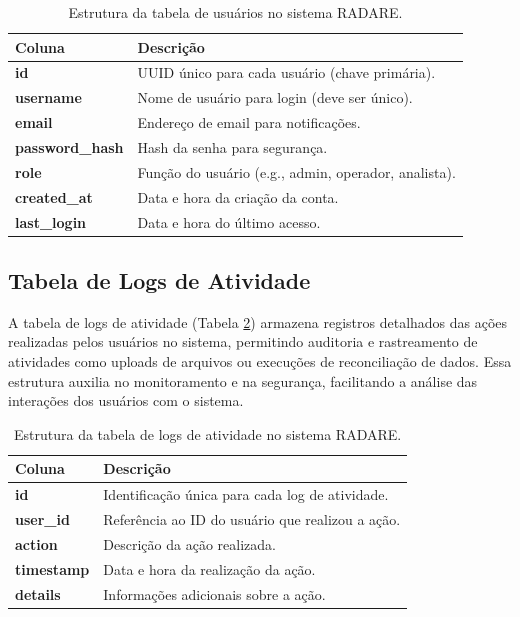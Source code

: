\begin{table}[htbp]
    \centering
    \caption{Estrutura da tabela de usuários no sistema RADARE.}
    \label{Tab:Users}
    \begin{tabular}{|l|p{10cm}|}
        \hline
        \textbf{Coluna} & \textbf{Descrição} \\ \hline
        \textbf{id} & UUID único para cada usuário (chave primária). \\ \hline
        \textbf{username} & Nome de usuário para login (deve ser único). \\ \hline
        \textbf{email} & Endereço de email para notificações. \\ \hline
        \textbf{password\_hash} & Hash da senha para segurança. \\ \hline
        \textbf{role} & Função do usuário (e.g., admin, operador, analista). \\ \hline
        \textbf{created\_at} & Data e hora da criação da conta. \\ \hline
        \textbf{last\_login} & Data e hora do último acesso. \\ \hline
    \end{tabular}
\end{table}

\subsection{Tabela de Logs de Atividade}

A tabela de logs de atividade (Tabela \ref{Tab:ActivityLogs}) armazena registros detalhados das ações realizadas pelos usuários no sistema, permitindo auditoria e rastreamento de atividades como uploads de arquivos ou execuções de reconciliação de dados. Essa estrutura auxilia no monitoramento e na segurança, facilitando a análise das interações dos usuários com o sistema.

\begin{table}[htbp]
    \centering
    \caption{Estrutura da tabela de logs de atividade no sistema RADARE.}
    \label{Tab:ActivityLogs}
    \begin{tabular}{|l|p{10cm}|}
        \hline
        \textbf{Coluna} & \textbf{Descrição} \\ \hline
        \textbf{id} & Identificação única para cada log de atividade. \\ \hline
        \textbf{user\_id} & Referência ao ID do usuário que realizou a ação. \\ \hline
        \textbf{action} & Descrição da ação realizada. \\ \hline
        \textbf{timestamp} & Data e hora da realização da ação. \\ \hline
        \textbf{details} & Informações adicionais sobre a ação. \\ \hline
    \end{tabular}
\end{table}

